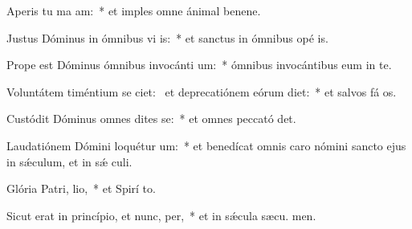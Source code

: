 \item Aperis tu ma am:~* et imples omne ánimal benene.
\item Justus Dóminus in ómnibus vi is:~* et sanctus in ómnibus opé is.
\item Prope est Dóminus ómnibus invocánti um:~* ómnibus invocántibus eum in te.
\item Voluntátem timéntium se ciet:~\pscross{} et deprecatiónem eórum diet:~* et salvos fá os.
\item Custódit Dóminus omnes dites se:~* et omnes peccató det.
\item Laudatiónem Dómini loquétur  um:~* et benedícat omnis caro nómini sancto ejus in sǽculum, et in sǽ culi.
\item Glória Patri,  lio,~* et Spirí to.
\item Sicut erat in princípio, et nunc,  per,~* et in sǽcula sæcu. men.
